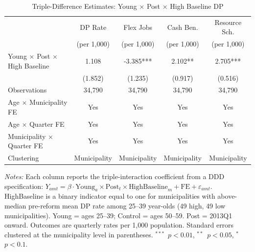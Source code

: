 \begin{table}[htbp]
\centering
\caption{Triple-Difference Estimates: Young $\times$ Post $\times$ High Baseline DP}
\label{tab:ddd}
\small
\begin{tabular}{l*{4}{c}}
\toprule
 & DP Rate & Flex Jobs & Cash Ben. & Resource Sch. \\
 & (per 1,000) & (per 1,000) & (per 1,000) & (per 1,000) \\
\midrule
Young $\times$ Post $\times$ High Baseline & 1.108 & -3.385*** & 2.102** & 2.705*** \\
 & (1.852) & (1.235) & (0.917) & (0.516) \\
\midrule
Observations & 34,790 & 34,790 & 34,790 & 34,790 \\
Age $\times$ Municipality FE & Yes & Yes & Yes & Yes \\
Age $\times$ Quarter FE & Yes & Yes & Yes & Yes \\
Municipality $\times$ Quarter FE & Yes & Yes & Yes & Yes \\
Clustering & Municipality & Municipality & Municipality & Municipality \\
\bottomrule
\end{tabular}
\begin{tablenotes}
\small
\item \textit{Notes:} Each column reports the triple-interaction coefficient from a DDD specification: $Y_{amt} = \beta \cdot \text{Young}_a \times \text{Post}_t \times \text{HighBaseline}_m + \text{FE} + \varepsilon_{amt}$. HighBaseline is a binary indicator equal to one for municipalities with above-median pre-reform mean DP rate among 25--39 year-olds (49 high, 49 low municipalities). Young = ages 25--39; Control = ages 50--59. Post = 2013Q1 onward. Outcomes are quarterly rates per 1,000 population. Standard errors clustered at the municipality level in parentheses. $^{***}$~$p<0.01$, $^{**}$~$p<0.05$, $^{*}$~$p<0.1$.
\end{tablenotes}
\end{table}
